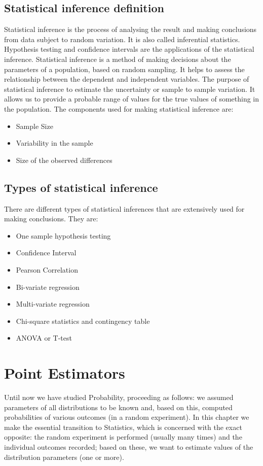 \subsection{Statistical inference definition}
Statistical inference is the process of analysing the result and making conclusions from data subject to random variation. 
It is also called inferential statistics. 
Hypothesis testing and confidence intervals are the applications of the statistical inference. 
Statistical inference is a method of making decisions about the parameters of a population, based on random sampling. 
It helps to assess the relationship between the dependent and independent variables. 
The purpose of statistical inference to estimate the uncertainty or sample to sample variation. 
It allows us to provide a probable range of values for the true values of something in the population. 
The components used for making statistical inference are:
\begin{itemize}
    \item Sample Size
    \item Variability in the sample
    \item Size of the observed differences
\end{itemize}

\subsection{Types of statistical inference}
There are different types of statistical inferences that are extensively used for making conclusions. 
They are:
\begin{itemize}
    \item One sample hypothesis testing
    \item Confidence Interval
    \item Pearson Correlation
    \item Bi-variate regression
    \item Multi-variate regression
    \item Chi-square statistics and contingency table
    \item ANOVA or T-test
\end{itemize}

\section{Point Estimators}

Until now we have studied Probability, proceeding as follows: we assumed parameters of all distributions to be known and, based on this, computed probabilities
of various outcomes (in a random experiment). In this chapter we make the essential transition to Statistics, which is concerned with the exact opposite: the
random experiment is performed (usually many times) and the individual outcomes
recorded; based on these, we want to estimate values of the distribution parameters
(one or more). 

